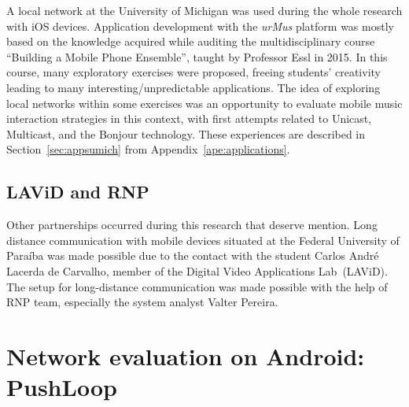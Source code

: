 
A local network at the University of Michigan was used during the whole research with iOS devices.
Application development with the \textit{urMus} platform was mostly based on the knowledge acquired while auditing the multidisciplinary course ``Building a Mobile Phone Ensemble'', taught by Professor Essl in 2015.
In this course, many exploratory exercises were proposed, freeing students' creativity leading to many interesting/unpredictable applications.
The idea of exploring local networks within some exercises was an opportunity to evaluate mobile music interaction strategies in this context, with first attempts related to Unicast, Multicast, and the Bonjour technology.
These experiences are described in Section~\ref{sec:appsumich} from Appendix~\ref{ape:applications}. 

\subsection*{LAViD and RNP}

Other partnerships occurred during this research that deserve mention.
Long distance communication with mobile devices situated at the Federal University of Paraíba was made possible due to the contact with the student Carlos André Lacerda de Carvalho, member of the Digital Video Applications Lab~(LAViD).
The setup for long-distance communication was made possible with the help of RNP team, especially the system analyst Valter Pereira.






\section{Network evaluation on Android: PushLoop}
\label{sec:apppushloop}

